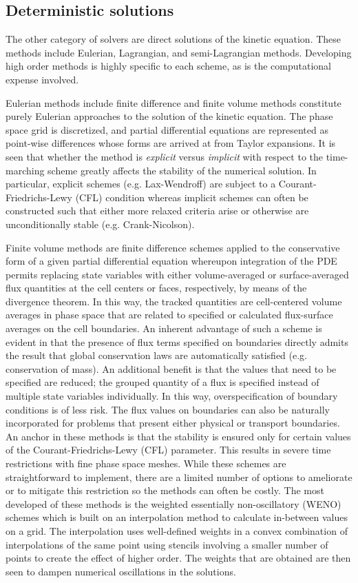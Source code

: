 \documentclass[11pt,titlepage]{report}
\begin{document}
\subsection{Deterministic solutions}

\indent\indent The other category of solvers are direct solutions of the kinetic equation. These methods include Eulerian, Lagrangian, and semi-Lagrangian methods. Developing high order methods is highly specific to each scheme, as is the computational expense involved.

Eulerian methods include finite difference and finite volume methods constitute purely Eulerian approaches to the solution of the kinetic equation. The phase space grid is discretized, and partial differential equations are represented as point-wise differences whose forms are arrived at from Taylor expansions. It is seen that whether the method is \emph{explicit} versus \emph{implicit} with respect to the time-marching scheme greatly affects the stability of the numerical solution. In particular, explicit schemes (e.g. Lax-Wendroff) are subject to a Courant-Friedrichs-Lewy (CFL) condition whereas implicit schemes can often be constructed such that either more relaxed criteria arise or otherwise are unconditionally stable (e.g. Crank-Nicolson).

Finite volume methods are finite difference schemes applied to the conservative form of a given partial differential equation whereupon integration of the PDE permits replacing state variables with either volume-averaged or surface-averaged flux quantities at the cell centers or faces, respectively, by means of the divergence theorem. In this way, the tracked quantities are cell-centered volume averages in phase space that are related to specified or calculated flux-surface averages on the cell boundaries. An inherent advantage of such a scheme is evident in that the presence of flux terms specified on boundaries directly admits the result that global conservation laws are automatically satisfied (e.g. conservation of mass). An additional benefit is that the values that need to be specified are reduced; the grouped quantity of a flux is specified instead of multiple state variables individually. In this way, overspecification of boundary conditions is of less risk. The flux values on boundaries can also be naturally incorporated for problems that present either physical or transport boundaries. An anchor in these methods is that the stability is ensured only for certain values of the Courant-Friedrichs-Lewy (CFL) parameter. This results in severe time restrictions with fine phase space meshes. While these schemes are straightforward to implement, there are a limited number of options to ameliorate or to mitigate this restriction so the methods can often be costly. The most developed of these methods is the weighted essentially non-oscillatory (WENO) schemes which is built on an interpolation method to calculate in-between values on a grid. The interpolation uses well-defined weights in a convex combination of interpolations of the same point using stencils involving a smaller number of points to create the effect of higher order. The weights that are obtained are then seen to dampen numerical oscillations in the solutions. 
\end{document}
